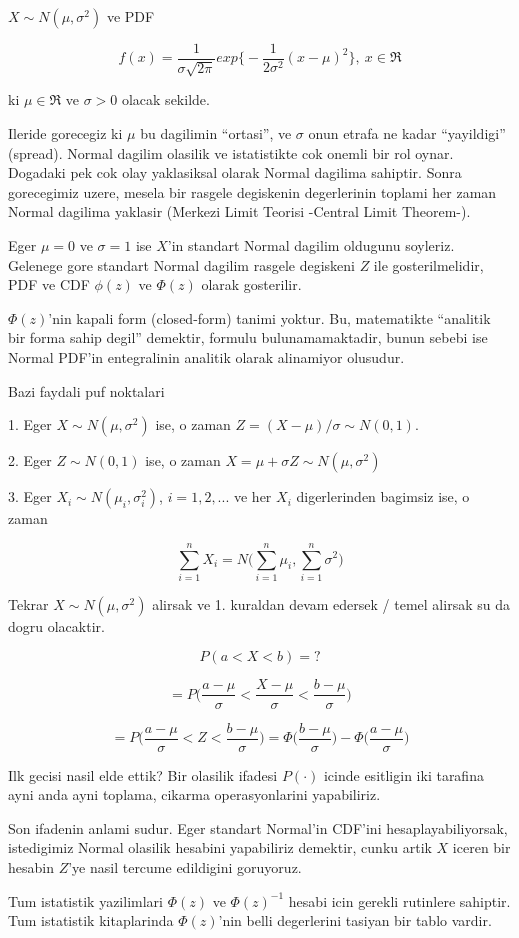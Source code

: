 \documentclass[12pt,fleqn]{article}
\begin{document}
$X \sim N(\mu, \sigma^2)$ ve PDF

\[ f(x) = \frac{1}{\sigma\sqrt{2\pi}} 
exp \bigg\{ - \frac{1}{2\sigma^2}(x-\mu)^2  \bigg\}
, \ x \in \Re
\]

ki $\mu \in \Re$ ve $\sigma > 0$ olacak sekilde.

Ileride gorecegiz ki $\mu$ bu dagilimin ``ortasi'', ve $\sigma$ onun
etrafa ne kadar ``yayildigi'' (spread). Normal dagilim olasilik ve
istatistikte cok onemli bir rol oynar. Dogadaki pek cok olay
yaklasiksal olarak Normal dagilima sahiptir. Sonra gorecegimiz uzere,
mesela bir rasgele degiskenin degerlerinin toplami her zaman Normal
dagilima yaklasir (Merkezi Limit Teorisi -Central Limit Theorem-). 

Eger $\mu = 0$ ve $\sigma = 1$ ise $X$'in standart Normal dagilim oldugunu
soyleriz. Gelenege gore standart Normal dagilim rasgele degiskeni $Z$ ile
gosterilmelidir, PDF ve CDF $\phi(z)$ ve $\Phi(z)$ olarak gosterilir. 

$\Phi(z)$'nin kapali form (closed-form) tanimi yoktur. Bu, matematikte
``analitik bir forma sahip degil'' demektir, formulu bulunamamaktadir,
bunun sebebi ise Normal PDF'in entegralinin analitik olarak alinamiyor
olusudur. 

Bazi faydali puf noktalari

1. Eger $X \sim N(\mu, \sigma^2)$ ise, o zaman $Z = (X-\mu) / \sigma \sim
N(0,1)$. 

2. Eger $Z \sim N(0,1)$ ise, o zaman $X = \mu + \sigma Z \sim N(\mu,\sigma^2)$

3. Eger $X_i \sim N(\mu_i, \sigma_i^2)$, $i=1,2,...$ ve her $X_i$
digerlerinden bagimsiz ise, o zaman 

\[ \sum_{i=1}^n X_i = N\bigg( \sum_{i=1}^n\mu_i, \sum_{i=1}^n\sigma^2 \bigg) \]

Tekrar $X \sim N(\mu, \sigma^2)$ alirsak ve 1. kuraldan devam edersek /
temel alirsak su da dogru olacaktir. 

\[ P(a < X < b) = ? \]

\[ 
= P\bigg(
\frac{a-\mu}{\sigma} < 
\frac{X-\mu}{\sigma} < 
\frac{b-\mu}{\sigma}
\bigg) 
\]

\[
= P\bigg(\frac{a-\mu}{\sigma} < Z < \frac{b-\mu}{\sigma}\bigg) 
= 
\Phi\bigg(\frac{b-\mu}{\sigma}\bigg) - 
\Phi\bigg(\frac{a-\mu}{\sigma}\bigg) 
\]

Ilk gecisi nasil elde ettik? Bir olasilik ifadesi $P(\cdot)$ icinde esitligin iki
tarafina ayni anda ayni toplama, cikarma operasyonlarini yapabiliriz. 

Son ifadenin anlami sudur. Eger standart Normal'in CDF'ini
hesaplayabiliyorsak, istedigimiz Normal olasilik hesabini yapabiliriz
demektir, cunku artik $X$ iceren bir hesabin $Z$'ye nasil tercume
edildigini goruyoruz. 

Tum istatistik yazilimlari $\Phi(z)$ ve $\Phi(z)^{-1}$ hesabi icin gerekli
rutinlere sahiptir. Tum istatistik kitaplarinda $\Phi(z)$'nin belli
degerlerini tasiyan bir tablo vardir.
\end{document}
